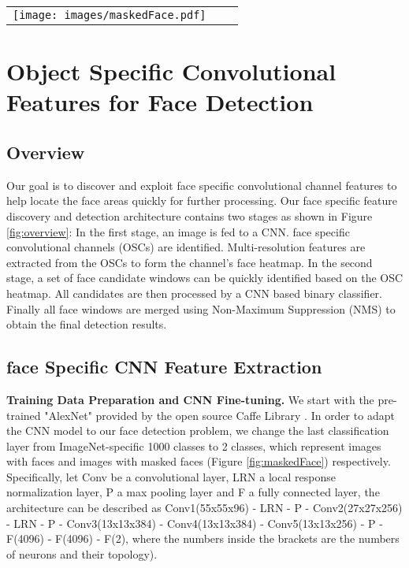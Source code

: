 \documentclass[10pt,twocolumn,letterpaper]{article}
\begin{document}
\begin{figure*}
\begin{tabular}{ccc}
\rule{0pt}{1ex}\hspace{2.24mm}\texttt{[image: images/maskedFace.pdf]}\\[-0.1pt]
\end{tabular}
\caption{Examples of masked face images (first row) and original images (second row) from AFLW \cite{kostinger2011annotated} for fine-tuning.}
\label{fig:maskedFace}
\end{figure*}


\section{Object Specific Convolutional Features for Face Detection}
\subsection{Overview}
Our goal is to discover and exploit face specific convolutional channel features to help locate the face areas quickly for further processing. 
Our face specific feature discovery and detection architecture contains two stages as shown in Figure \ref{fig:overview}: In the first stage, an image is fed to a CNN. face specific convolutional channels (OSCs) are identified. Multi-resolution features are extracted from the OSCs to form the channel's face heatmap. In the second stage, a set of face candidate windows can be quickly identified based on the OSC heatmap. All candidates are then processed by a CNN based binary classifier. Finally all face windows are merged using Non-Maximum Suppression (NMS) \cite{neubeck2006efficient} to obtain the final detection results.

\subsection{face Specific CNN Feature Extraction}


{\bf Training Data Preparation and CNN Fine-tuning.} We start with the pre-trained "AlexNet" \cite{krizhevsky2012imagenet} provided by the open source Caffe Library \cite{jia2014caffe}. In order to adapt the CNN model to our face detection problem, we change the last classification layer from ImageNet-specific 1000 classes to 2 classes, which represent images with faces and images with masked faces (Figure \ref{fig:maskedFace}) respectively. Specifically, let Conv be a convolutional layer, LRN a local response normalization layer, P a max pooling layer and F a fully connected layer, the architecture can be described as Conv1(55x55x96) - LRN - P - Conv2(27x27x256) - LRN - P - Conv3(13x13x384) - Conv4(13x13x384) - Conv5(13x13x256) - P - F(4096) - F(4096) - F(2), where the numbers inside the brackets are the numbers of neurons and their topology).
\end{document}
